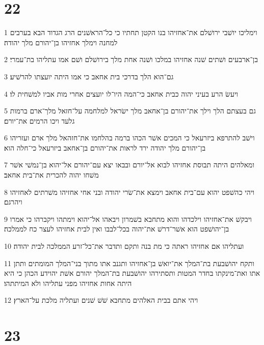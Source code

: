 \chapter{22}

\par 1 וימליכו יושׁבי ירושׁלם את־אחזיהו בנו הקטן תחתיו כי כל־הראשׁנים הרג הגדוד הבא בערבים למחנה וימלך אחזיהו בן־יהורם מלך יהודה׃
\par 2 בן־ארבעים ושׁתים שׁנה אחזיהו במלכו ושׁנה אחת מלך בירושׁלם ושׁם אמו עתליהו בת־עמרי׃
\par 3 גם־הוא הלך בדרכי בית אחאב כי אמו היתה יועצתו להרשׁיע׃
\par 4 ויעשׂ הרע בעיני יהוה כבית אחאב כי־המה היו־לו יועצים אחרי מות אביו למשׁחית לו׃
\par 5 גם בעצתם הלך וילך את־יהורם בן־אחאב מלך ישׂראל למלחמה על־חזאל מלך־ארם ברמות גלעד ויכו הרמים את־יורם׃
\par 6 וישׁב להתרפא ביזרעאל כי המכים אשׁר הכהו ברמה בהלחמו את־חזהאל מלך ארם ועזריהו בן־יהורם מלך יהודה ירד לראות את־יהורם בן־אחאב ביזרעאל כי־חלה הוא׃
\par 7 ומאלהים היתה תבוסת אחזיהו לבוא אל־יורם ובבאו יצא עם־יהורם אל־יהוא בן־נמשׁי אשׁר משׁחו יהוה להכרית את־בית אחאב׃
\par 8 ויהי כהשׁפט יהוא עם־בית אחאב וימצא את־שׂרי יהודה ובני אחי אחזיהו משׁרתים לאחזיהו ויהרגם׃
\par 9 ויבקשׁ את־אחזיהו וילכדהו והוא מתחבא בשׁמרון ויבאהו אל־יהוא וימתהו ויקברהו כי אמרו בן־יהושׁפט הוא אשׁר־דרשׁ את־יהוה בכל־לבבו ואין לבית אחזיהו לעצר כח לממלכה׃
\par 10 ועתליהו אם אחזיהו ראתה כי מת בנה ותקם ותדבר את־כל־זרע הממלכה לבית יהודה׃
\par 11 ותקח יהושׁבעת בת־המלך את־יואשׁ בן־אחזיהו ותגנב אתו מתוך בני־המלך המומתים ותתן אתו ואת־מינקתו בחדר המטות ותסתירהו יהושׁבעת בת־המלך יהורם אשׁת יהוידע הכהן כי היא היתה אחות אחזיהו מפני עתליהו ולא המיתתהו׃
\par 12 ויהי אתם בבית האלהים מתחבא שׁשׁ שׁנים ועתליה מלכת על־הארץ׃

\chapter{23}

